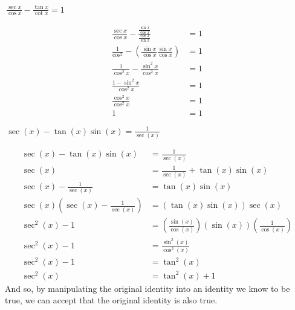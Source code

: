 \documentclass[addpoints]{exam}
\begin{document}
\begin{tcolorbox}[breakable, title=TRIG IDENTITIES, colframe=black, sharp corners, colback=white, colbacktitle=white, coltitle=black]
\begin{questions}
            \question \(\displaystyle\, \frac{\sec x}{\cos x} - \frac{\tan x}{\cot x} = 1\)
            \begin{solution}[\stretch{1}]
                \begin{align*}
                    \frac{\sec x}{\cos x} - \frac{\frac{\sin x}{\cos x}}{\frac{\cos x}{\sin x}} &= 1 \\ 
                    \frac{1}{\cos^2} - \left(\frac{\sin x}{\cos x} \frac{\sin x}{\cos x}\right) &= 1 \\ 
                    \frac{1}{\cos^2 x} - \frac{\sin^2 x}{\cos^2 x} &= 1 \\ 
                    \frac{1 - \sin^2 x}{\cos^2 x} &= 1 \\ 
                    \frac{\cos^2 x}{\cos^2 x} &= 1 \\ 
                    1 &= 1
                \end{align*}
            \end{solution}
            \newpage
            \question \(\displaystyle\, \sec(x)-\tan(x)\sin(x) = \frac{1}{\sec(x)}\)
            \begin{solution}[\stretch{1}]
               \begin{align*}
                   \sec(x)-\tan(x)\sin(x) &= \frac{1}{\sec(x)} \\ 
                   \sec(x) &= \frac{1}{\sec(x)} + \tan(x)\sin(x) \\ 
                   \sec(x) - \frac{1}{\sec(x)} &= \tan(x)\sin(x) \\ 
                   \sec(x)\left(\sec(x) - \frac{1}{\sec(x)}\right) &= \left(\tan(x)\sin(x)\right)\sec(x) \\ 
                   \sec^2(x) - 1 &= \left(\frac{\sin(x)}{\cos(x)}\right)\left(\sin(x)\right)\left(\frac{1}{\cos(x)}\right) \\
                   \sec^2(x) - 1 &= \frac{\sin^2(x)}{\cos^2(x)} \\
                   \sec^2(x) - 1 &= \tan^2(x) \\ 
                   \sec^2(x) &= \tan^2(x) + 1
               \end{align*}
               And so, by manipulating the original identity into an identity we know to be true, we can accept that the original identity is also true. 
            \end{solution}


\end{questions}
\end{tcolorbox}
\end{document}
